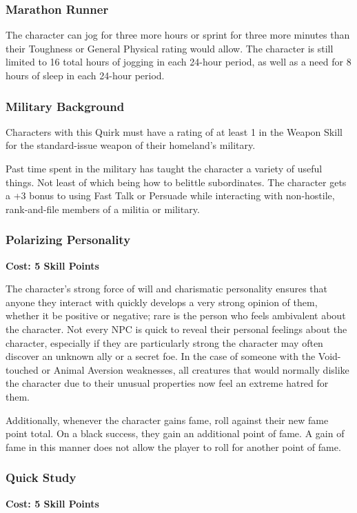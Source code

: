 \documentclass[oneside]{book}
\begin{document}
\begin{multicols}{2}
\subsubsection{Marathon Runner}
The character can jog for three more hours or sprint for three more minutes than their Toughness or General Physical rating would allow. The character is still limited to 16 total hours of jogging in each 24-hour period, as well as a need for 8 hours of sleep in each 24-hour period.

\subsubsection{Military Background}
Characters with this Quirk must have a rating of at least 1 in the Weapon Skill for the standard-issue weapon of their homeland's military. 

Past time spent in the military has taught the character a variety of useful things. Not least of which being how to belittle subordinates. The character gets a +3 bonus to using Fast Talk or Persuade while interacting with non-hostile, rank-and-file members of a militia or military. 

\subsubsection{Polarizing Personality}
\textbf{\small Cost: 5 Skill Points}

The character's strong force of will and charismatic personality ensures that anyone they interact with quickly develops a very strong opinion of them, whether it be positive or negative; rare is the person who feels ambivalent about the character. Not every NPC is quick to reveal their personal feelings about the character, especially if they are particularly strong the character may often discover an unknown ally or a secret foe. In the case of someone with the Void-touched or Animal Aversion weaknesses, all creatures that would normally dislike the character due to their unusual properties now feel an extreme hatred for them.

Additionally, whenever the character gains fame, roll against their new fame point total. On a black success, they gain an additional point of fame. A gain of fame in this manner does not allow the player to roll for another point of fame.

\subsubsection{Quick Study}
\textbf{\small Cost: 5 Skill Points}


\end{multicols}
\end{document}
